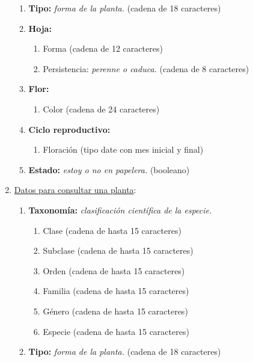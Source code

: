 \documentclass[10pt,a4paper]{article}
\begin{document}
\begin{enumerate}[label={RD\arabic*.} ,leftmargin=2.8\parindent]
\begin{enumerate}[label={RD9.\arabic*.}]
	\item 
		\textbf{Tipo:} \textit{forma de la planta.} (cadena de 18 caracteres)

	\medskip
	\item
		\textbf{Hoja:}
	\begin{enumerate}[label=-]
		\item Forma (cadena de 12 caracteres)
		\item Persistencia: \textit{perenne o caduca.} (cadena de 8 caracteres)
	\end{enumerate}

	\medskip
	\item
		\textbf{Flor:}
	\begin{enumerate} [label=-]
		\item Color (cadena de 24 caracteres)
	\end{enumerate}
		
	\medskip 
	\item
		\textbf{Ciclo reproductivo:}
	\begin{enumerate} [label=-]
		\item Floración (tipo date con mes inicial y final)
	\end{enumerate}
	\medskip
	\item
		\textbf{Estado:} \textit{estoy o no en papelera.} (booleano)	
	\medskip \medskip
		\end{enumerate}
	
 	\item \underline{Datos para consultar una planta}:
	\begin{enumerate}[label={RD10.\arabic*.}]
	
	\item 
		\textbf{Taxonomía:} \textit{clasificación científica de la especie.}
	\begin{enumerate}[label=-]
		\item Clase (cadena de hasta 15 caracteres)
		\item Subclase (cadena de hasta 15 caracteres)
		\item Orden (cadena de hasta 15 caracteres)
		\item Familia (cadena de hasta 15 caracteres)
		\item Género (cadena de hasta 15 caracteres)
		\item Especie (cadena de hasta 15 caracteres)
	\end{enumerate}
	\medskip
	
	\item 
		\textbf{Tipo:} \textit{forma de la planta.} (cadena de 18 caracteres)


\end{enumerate}
\end{enumerate}
\end{document}
